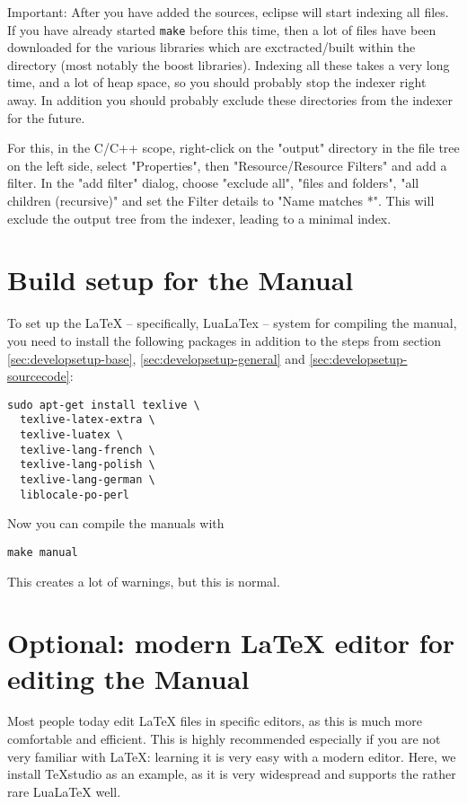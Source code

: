 Important: After you have added the sources, eclipse will start indexing all files. If you have already started \texttt{make} before this time, then a lot of files have been downloaded for the various libraries which are exctracted/built within the \xc directory (most notably the boost libraries). Indexing all these takes a very long time, and a lot of heap space, so you should probably stop the indexer right away. In addition you should probably exclude these directories from the indexer for the future.

For this, in the C/C++ scope, right-click on the "output" directory in the file tree on the left side, select "Properties", then "Resource/Resource Filters" and add a filter. In the "add filter" dialog, choose "exclude all", "files and folders", "all children (recursive)" and set the Filter details to "Name matches *".
This will exclude the output tree from the indexer, leading to a minimal index.

\section{Build setup for the Manual}
To set up the LaTeX -- specifically, LuaLaTex -- system for compiling the manual, you need to install the following packages in addition to the steps from section \ref{sec:developsetup-base}, \ref{sec:developsetup-general} and \ref{sec:developsetup-sourcecode}:

\begin{verbatim}
sudo apt-get install texlive \
  texlive-latex-extra \
  texlive-luatex \
  texlive-lang-french \
  texlive-lang-polish \
  texlive-lang-german \
  liblocale-po-perl
\end{verbatim}

Now you can compile the manuals with 

\begin{verbatim}
make manual
\end{verbatim}

This creates a lot of warnings, but this is normal.

\section{Optional: modern LaTeX editor for editing the Manual}
Most people today edit LaTeX files in specific editors, as this is much more comfortable and efficient. This is highly recommended especially if you are not very familiar with LaTeX: learning it is very easy with a modern editor. Here, we install TeXstudio as an example, as it is very widespread and supports the rather rare LuaLaTeX well.

